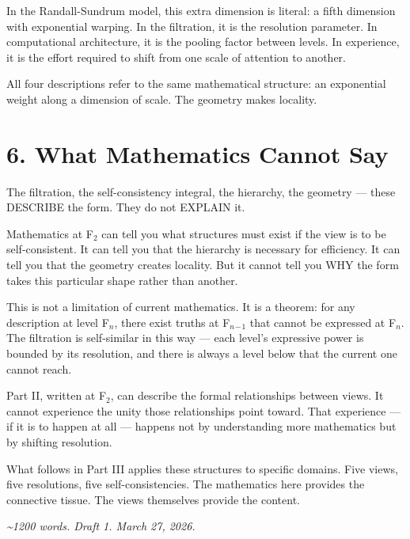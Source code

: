 In the Randall-Sundrum model, this extra dimension is literal: a fifth dimension with exponential warping. In the filtration, it is the resolution parameter. In computational architecture, it is the pooling factor between levels. In experience, it is the effort required to shift from one scale of attention to another.


All four descriptions refer to the same mathematical structure: an exponential weight along a dimension of scale. The geometry makes locality.


\section*{6. What Mathematics Cannot Say}


The filtration, the self-consistency integral, the hierarchy, the geometry — these DESCRIBE the form. They do not EXPLAIN it.


Mathematics at F$_2$ can tell you what structures must exist if the view is to be self-consistent. It can tell you that the hierarchy is necessary for efficiency. It can tell you that the geometry creates locality. But it cannot tell you WHY the form takes this particular shape rather than another.


This is not a limitation of current mathematics. It is a theorem: for any description at level F$_n$, there exist truths at F$_n$$_{-}$$_1$ that cannot be expressed at F$_n$. The filtration is self-similar in this way — each level's expressive power is bounded by its resolution, and there is always a level below that the current one cannot reach.


Part II, written at F$_2$, can describe the formal relationships between views. It cannot experience the unity those relationships point toward. That experience — if it is to happen at all — happens not by understanding more mathematics but by shifting resolution.


What follows in Part III applies these structures to specific domains. Five views, five resolutions, five self-consistencies. The mathematics here provides the connective tissue. The views themselves provide the content.


\bigskip\noindent\makebox[\textwidth]{\color{rulegray}\rule{5cm}{0.3pt}}\bigskip


\textit{\textasciitilde{}1200 words. Draft 1. March 27, 2026.}

